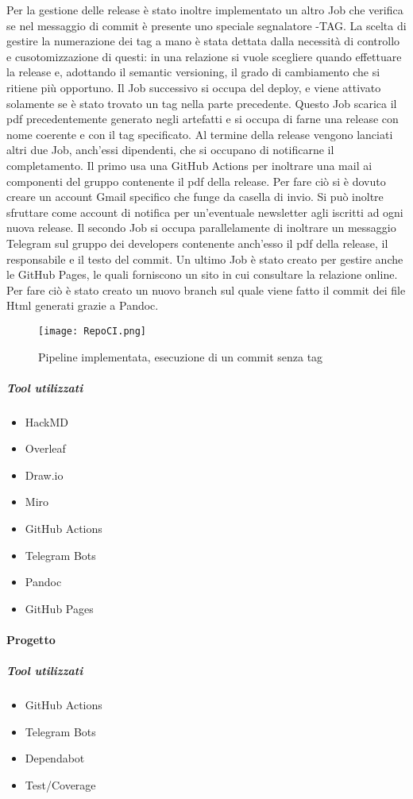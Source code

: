         Per la gestione delle release è stato inoltre implementato un altro Job che verifica se nel messaggio di commit è presente uno speciale segnalatore -TAG{}. 
        La scelta di gestire la numerazione dei tag a mano è stata dettata dalla necessità di controllo e cusotomizzazione di questi: in una relazione si vuole scegliere quando effettuare la release e, adottando il semantic versioning, il grado di cambiamento che si ritiene più opportuno.
        Il Job successivo si occupa del deploy, e viene attivato solamente se è stato trovato un tag nella parte precedente. Questo Job scarica il pdf precedentemente generato negli artefatti e si occupa di farne una release con nome coerente e con il tag specificato. 
        Al termine della release vengono lanciati altri due Job, anch'essi dipendenti, che si occupano di notificarne il completamento. 
        Il primo usa una GitHub Actions per inoltrare una mail ai componenti del gruppo contenente il pdf della release. Per fare ciò si è dovuto creare un account Gmail specifico che funge da casella di invio. Si può inoltre sfruttare come account di notifica per un'eventuale newsletter agli iscritti ad ogni nuova release. 
        Il secondo Job si occupa parallelamente di inoltrare un messaggio Telegram sul gruppo dei developers contenente anch'esso il pdf della release, il responsabile e il testo del commit.
        Un ultimo Job è stato creato per gestire anche le GitHub Pages, le quali forniscono un sito in cui consultare la relazione online. Per fare ciò è stato   creato un nuovo branch sul quale viene fatto il commit dei file Html generati grazie a Pandoc.
        \begin{figure}[h]
            \caption{Pipeline implementata, esecuzione di un commit senza tag}
            \centering
            \texttt{[image: RepoCI.png]}
        \end{figure}
        
        \subparagraph{Tool utilizzati}
        \begin{itemize}
            \item HackMD
            \item Overleaf
            \item Draw.io
            \item Miro
            \item GitHub Actions
            \item Telegram Bots
            \item Pandoc
            \item GitHub Pages
        \end{itemize}

    \paragraph{Progetto}
        
        \subparagraph{Tool utilizzati}
        \begin{itemize}
            \item GitHub Actions
            \item Telegram Bots
            \item Dependabot
            \item Test/Coverage
        \end{itemize}








